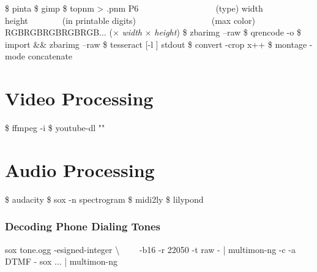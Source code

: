 \documentclass{refcard}
\begin{document}
\begin{ldesc}
	   \$ pinta 
	 \$ gimp 
	    \$ topnm  > .pnm
	 P6~~~~~~~~~~~~~~~~~~\textnormal{(type)}\li
	                      width height~~~~~~~~\textnormal{(in printable digits)} ~~~~~~~~~~~~~~~~~\textnormal{(max color)} \li
					      RGBRGBRGBRGBRGB...  \textnormal{($\times$ \textit{width} $\times$ \textit{height})}
	   \$ zbarimg --raw 
	 \$ qrencode  -o 
	 \$ import  \&\& zbarimg --raw 
	 \$ tesseract [-l ]  stdout
	\li[Crop]                 \$ convert -crop x++  
	       \$ montage -mode concatenate  
\end{ldesc}


\section{Video Processing}

\begin{ldesc}
	  \$ ffmpeg -i  
	 \$ youtube-dl ""
\end{ldesc}


\section{Audio Processing}

\begin{ldesc}
	   \$ audacity 
	\li[Spectrogram]                   \$ sox  -n spectrogram
	       \$ midi2ly 
	          \$ lilypond 
\end{ldesc}

\subsubsection{Decoding Phone Dialing Tones}

\begin{ldesc}
	   sox tone.ogg -esigned-integer \textbackslash \li
	                   ~~~~-b16 -r 22050 -t raw - | \li
	                   multimon-ng -c -a DTMF -
	 sox ... | multimon-ng
\end{ldesc}
\end{document}
